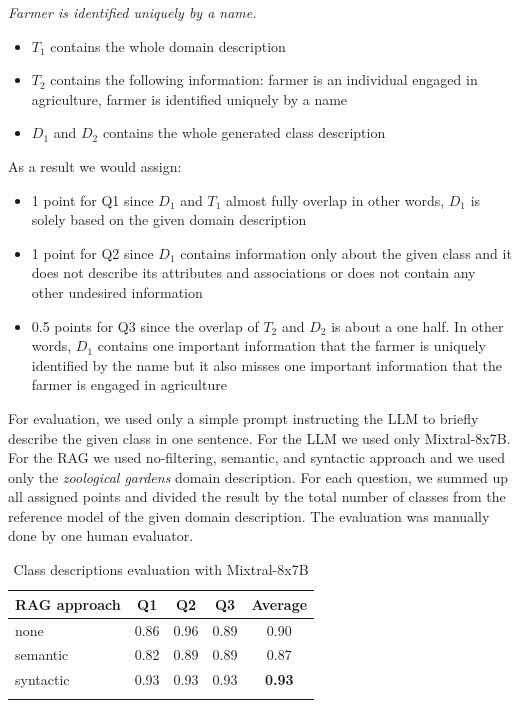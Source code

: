 \noindent{}\textit{Farmer is identified uniquely by a name.}

\begin{itemize}
\item $T_1$ contains the whole domain description
\item $T_2$ contains the following information: farmer is an individual engaged in agriculture, farmer is identified uniquely by a name
\item $D_1$ and $D_2$ contains the whole generated class description
\end{itemize}

\noindent{}As a result we would assign:

\begin{itemize}
\item 1 point for Q1 since $D_1$ and $T_1$ almost fully overlap in other words, $D_1$ is solely based on the given domain description
\item 1 point for Q2 since $D_1$ contains information only about the given class and it does not describe its attributes and associations or does not contain any other undesired information
\item 0.5 points for Q3 since the overlap of $T_2$ and $D_2$ is about a one half. In other words, $D_1$ contains one important information that the farmer is uniquely identified by the name but it also misses one important information that the farmer is engaged in agriculture
\end{itemize}

For evaluation, we used only a simple prompt instructing the LLM to briefly describe the given class in one sentence. For the LLM we used only Mixtral-8x7B. For the RAG we used no-filtering, semantic, and syntactic approach and we used only the \emph{zoological gardens} domain description. For each question, we summed up all assigned points and divided the result by the total number of classes from the reference model of the given domain description. The evaluation was manually done by one human evaluator.

\begin{table}[!h]
    \scriptsize
    \centering
    \setlength{\tabcolsep}{0.5em}
    \begin{tabular}{lcccc}
     \toprule
        RAG approach & Q1 & Q2 & Q3 & Average \\
    \toprule
    
    \addlinespace
         none       & 0.86 & 0.96 & 0.89 & 0.90 \\
    	 semantic   & 0.82 & 0.89 & 0.89 & 0.87 \\
         syntactic  & 0.93 & 0.93 & 0.93 & \textbf{0.93} \\
    \addlinespace
    \bottomrule
    \addlinespace
    \end{tabular}
    \caption{Class descriptions evaluation with Mixtral-8x7B}
    \label{tab:mixtral-classes-descriptions}
\end{table}

